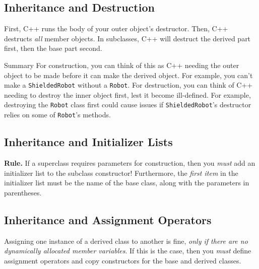 \documentclass[class=article, crop=false]{standalone}
\begin{document}
  \subsection{Inheritance and Destruction}
  First, C++ runs the body of your outer object's destructor. Then, C++ destructs \emph{all} member objects. In subclasses, C++ will destruct the derived part first, then the base part second.
  \begin{note}{Summary}
    For construction, you can think of this as C++ needing the outer object to be made before it can make the derived object. For example, you can't make a \texttt{ShieldedRobot} without a \texttt{Robot}. For destruction, you can think of C++ needing to destroy the inner object first, lest it become ill-defined. For example, destroying the \texttt{Robot} class first could cause issues if \texttt{ShieldedRobot}'s destructor relies on some of \texttt{Robot}'s methods.
  \end{note}
  \subsection{Inheritance and Initializer Lists}
  \textbf{Rule.} If a superclass requires parameters for construction, then you \emph{must} add an initializer list to the subclass constructor! Furthermore, the \emph{first item} in the initializer list must be the name of the base class, along with the parameters in parentheses.
  \subsection{Inheritance and Assignment Operators}
  Assigning one instance of a derived class to another is fine, \emph{only if there are no dynamically allocated member variables}. If this is the case, then you \emph{must} define assignment operators and copy constructors for the base and derived classes.
\end{document}
